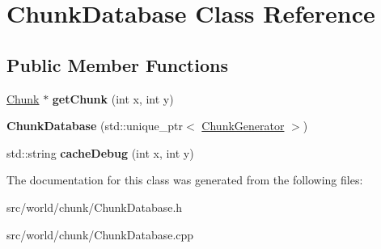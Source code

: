 \hypertarget{classChunkDatabase}{\section{Chunk\-Database Class Reference}
\label{classChunkDatabase}
}
\subsection*{Public Member Functions}
\begin{DoxyCompactItemize}
\item 
\hypertarget{classChunkDatabase_abcf683d90bbfc79651f0ccc377037c64}{\hyperlink{classChunk}{Chunk} $\ast$ {\bfseries get\-Chunk} (int x, int y)}\label{classChunkDatabase_abcf683d90bbfc79651f0ccc377037c64}

\item 
\hypertarget{classChunkDatabase_ac679a24342adcd98d02c3318882651e4}{{\bfseries Chunk\-Database} (std\-::unique\-\_\-ptr$<$ \hyperlink{classChunkGenerator}{Chunk\-Generator} $>$)}\label{classChunkDatabase_ac679a24342adcd98d02c3318882651e4}

\item 
\hypertarget{classChunkDatabase_a859a5a44d31f8fa40fe8d7936b27b5f5}{std\-::string {\bfseries cache\-Debug} (int x, int y)}\label{classChunkDatabase_a859a5a44d31f8fa40fe8d7936b27b5f5}

\end{DoxyCompactItemize}


The documentation for this class was generated from the following files\-:\begin{DoxyCompactItemize}
\item 
src/world/chunk/Chunk\-Database.\-h\item 
src/world/chunk/Chunk\-Database.\-cpp\end{DoxyCompactItemize}

